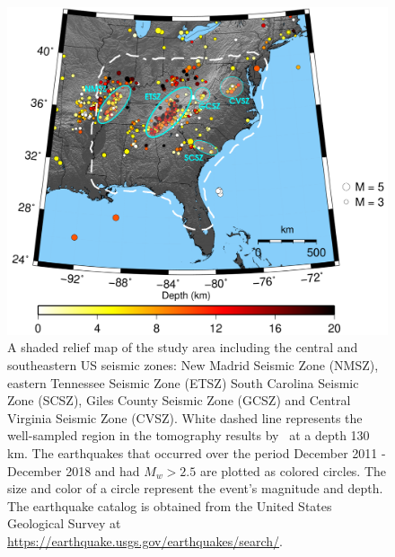 \documentclass[draft,linenumbers]{agujournal2018}
\begin{document}

\begin{figure}[ht]
    \centering
    \includegraphics[width=32pc]{figures/seismicity_new.png}
    \caption{ A shaded relief map of the study area including the central and southeastern US seismic zones: New Madrid Seismic Zone (NMSZ), eastern Tennessee  Seismic Zone (ETSZ) South Carolina Seismic Zone (SCSZ), Giles County Seismic Zone (GCSZ) and Central Virginia Seismic Zone (CVSZ). White dashed line represents the well-sampled region in the tomography results by~\citet{Biryol_2016} at a depth 130 km. The earthquakes that occurred over the period December 2011 - December 2018 and had $M_{w} > 2.5$ are plotted as colored circles. The size and color of a circle represent the event's magnitude and depth. The earthquake catalog is obtained from the United States Geological Survey at \url{https://earthquake.usgs.gov/earthquakes/search/}.}
    \label{figone}
 \end{figure}
   
    
\end{document}
